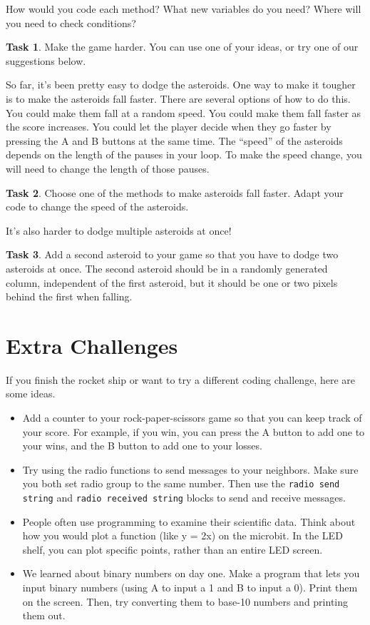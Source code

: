 \documentclass[11pt]{article}
\theoremstyle{definition}
\newtheorem{task}{Task}
\begin{document}
How would you code each method? What new variables do you need? Where will you need to check conditions? 

\begin{task}
Make the game harder. You can use one of your ideas, or try one of our suggestions below.
\end{task}

So far, it's been pretty easy to dodge the asteroids. One way to make it tougher is to make the asteroids fall faster. There are several options of how to do this. You could make them fall at a random speed. You could make them fall faster as the score increases. You could let the player decide when they go faster by pressing the A and B buttons at the same time. The ``speed'' of the asteroids depends on the length of the pauses in your loop. To make the speed change, you will need to change the length of those pauses.

\begin{task}
Choose one of the methods to make asteroids fall faster. Adapt your code to change the speed of the asteroids.
\end{task}

It's also harder to dodge multiple asteroids at once! 

\begin{task}
  Add a second asteroid to your game so that you have to dodge two asteroids at
  once. The second asteroid should be in a randomly generated column,
  independent of the first asteroid, but it should be one or two pixels behind
  the first when falling.
\end{task}

\section{Extra Challenges}
If you finish the rocket ship or want to try a different coding challenge, here are some ideas.

\begin{itemize}
\item Add a counter to your rock-paper-scissors game so that you can keep track of your score. For example, if you win, you can press the A button to add one to your wins, and the B button to add one to your losses.

\item Try using the radio functions to send messages to your neighbors. Make sure you both set radio group to the same number. Then use the \texttt{radio send string} and \texttt{radio received string} blocks to send and receive messages.

\item People often use programming to examine their scientific data. Think about how you would plot a function (like y = 2x) on the microbit. In the LED shelf, you can plot specific points, rather than an entire LED screen.

\item We learned about binary numbers on day one. Make a program that lets you input binary numbers (using A to input a 1 and B to input a 0). Print them on the screen. Then, try converting them to base-10 numbers and printing them out.

\end{itemize}
\end{document}

